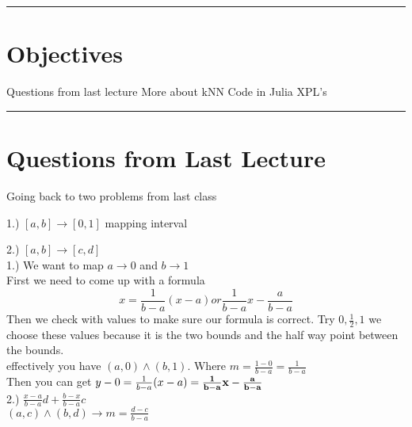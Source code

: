 \documentclass[11pt]{exam}
\newcommand{\hwheadings}[2]{
{\bf \tl} \hfill {{\tr}}\\
{\bl } \hfill { \br  } \\
\rule[0.1in]{\textwidth}{0.0025in}
}
\begin{document}
\hwheadings{1}{\professor}
\vspace{-0.25cm}

%   

\section*{Objectives}
\begin{outline}
    \1 Questions from last lecture
    \1 More about kNN
    \1 Code in Julia
    \1 XPL's
\end{outline}

\rule[0.0051in]{\textwidth}{0.00025in}


\section{Questions from Last Lecture}
Going back to two problems from last class

1.) $[a,b] \rightarrow [0,1]$ mapping interval

2.) $[a,b] \rightarrow [c,d]$ \\

1.) We want to map $a \rightarrow 0$ and $b \rightarrow 1$ \\
First we need to come up with a formula
\[
    x=\frac{1}{b-a}(x-a) or \frac{1}{b-a}x-\frac{a}{b-a}
\]
Then we check with values to make sure our formula is correct.
Try $0,\frac{1}{2},1$ we choose these values because it is the two bounds and the half way point between the bounds. \\

effectively you have $(a,0) \land (b,1)$. Where $m=\frac{1-0}{b-a}=\frac{1}{b-a}$ \\

Then you can get $y-0=\frac{1}{b-a}(x-a)= \bold{\frac{1}{b-a}x-\frac{a}{b-a}}$\\

2.) $\frac{x-a}{b-a}d + \frac{b-x}{b-a}c$ \\
$(a,c) \land (b,d) \rightarrow m = \frac{d-c}{b-a}$ \\
\end{document}
